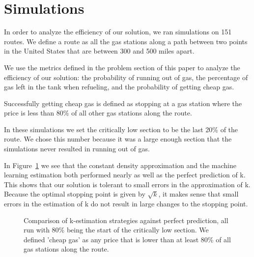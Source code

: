 \section{Simulations}
In order to analyze the efficiency of our solution, we ran simulations on 151 routes. We define a route as all the gas stations along a path between two points in the United States that are between 300 and 500 miles apart.

We use the metrics defined in the problem section of this paper to analyze the efficiency of our solution: the probability of running out of gas, the percentage of gas left in the tank when refueling, and the probability of getting cheap gas.

Successfully getting cheap gas is defined as stopping at a gas station where the price is less than 80\% of all other gas stations along the route.

In these simulations we set the critically low section to be the last 20\% of the route. We chose this number because it was a large enough section that the simulations never resulted in running out of gas.

In Figure~\ref{fig:results} we see that the constant density approximation and the machine learning estimation both performed nearly as well as the perfect prediction of k. This shows that our solution is tolerant to small errors in the approximation of k. Because the optimal stopping point is given by $\sqrt{k}$, it makes sense that small errors in the estimation of k do not result in large changes to the stopping point.

\begin{figure}
\label{fig:results}
\centering
\caption{Comparison of k-estimation strategies against perfect prediction, all run with 80\% being the start of the critically low section. We defined 'cheap gas' as any price that is lower than at least 80\% of all gas stations along the route.}
\end{figure}
